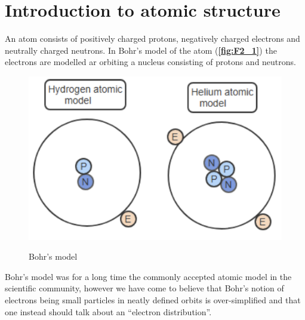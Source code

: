 
\section{Introduction to atomic structure} \label{sec:int}
An atom consists of positively charged protons, negatively charged electrons and neutrally charged neutrons. In Bohr's model of the atom (\textbf{\autoref{fig:F2_1}}) the electrons are modelled ar orbiting a nucleus consisting of protons and neutrons. 
\begin{figure} [ht]
  \centering
  \caption{Bohr's model}
  \includegraphics[width=0.35\linewidth]{./figures/F2_1.png}
  \label{fig:F2_1}
\end{figure}
Bohr's model was for a long time the commonly accepted atomic model in the scientific community, however we have come to believe that Bohr's notion of electrons being small particles in neatly defined orbits is over-simplified and that one instead should talk about an ``electron distribution''.

